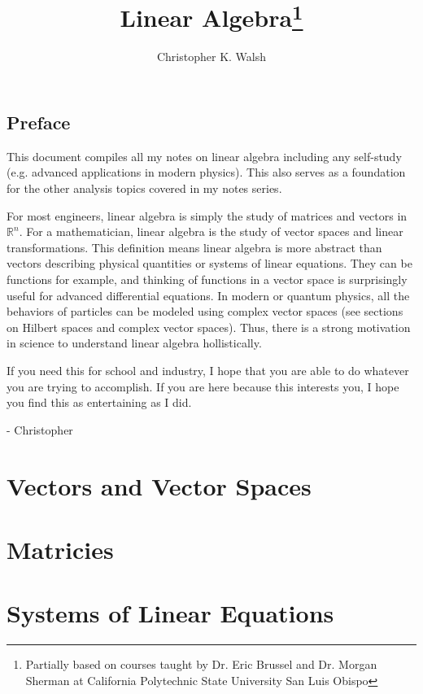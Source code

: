 \documentclass[12pt,openany]{book}
\title{Linear Algebra\thanks{Partially based on courses taught by Dr. Eric Brussel and Dr. Morgan Sherman at California Polytechnic State University San Luis Obispo}}
\author{Christopher K. Walsh}
\theoremstyle{mydefinitionstyle}
\theoremstyle{myexamplestyle}
\theoremstyle{remark}
\begin{document}
\maketitle
\tableofcontents

\newpage
\section*{Preface}
This document compiles all my notes on linear algebra including any self-study (e.g. advanced applications in modern physics).
This also serves as a foundation for the other analysis topics covered in my notes series.

For most engineers, linear algebra is simply the study of matrices and vectors in \( \mathbb{R}^n \).
For a mathematician, linear algebra is the study of vector spaces and linear transformations.
This definition means linear algebra is more abstract than vectors describing physical quantities or systems of linear equations.
They can be functions for example, and thinking of functions in a vector space is surprisingly useful for advanced differential equations.
In modern or quantum physics, all the behaviors of particles can be modeled using complex vector spaces (see sections on Hilbert spaces and complex vector spaces).
Thus, there is a strong motivation in science to understand linear algebra hollistically.

If you need this for school and industry, I hope that you are able to do whatever you are trying to accomplish.
If you are here because this interests you, I hope you find this as entertaining as I did.

- Christopher


\chapter{Vectors and Vector Spaces}



\chapter{Matricies}


\chapter{Systems of Linear Equations}

\end{document}
